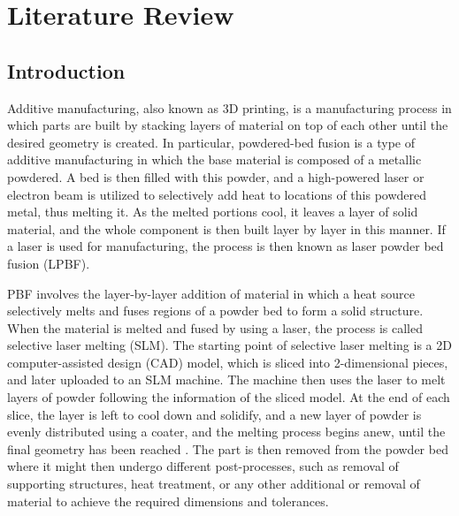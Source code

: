 \documentclass[../main.tex]{subfiles}
\begin{document}
	
\chapter{Literature Review}

\section{Introduction}

Additive manufacturing, also known as 3D printing, is a manufacturing process in which parts are built by stacking layers of material on top of each other until the desired geometry is created. In particular, powdered-bed fusion is a type of additive manufacturing in which the base material is composed of a metallic powdered. A bed is then filled with this powder, and a high-powered laser or electron beam is utilized to selectively add heat to locations of this powdered metal, thus melting it. As the melted portions cool, it leaves a layer of solid material, and the whole component is then built layer by layer in this manner. If a laser is used for manufacturing, the process is then known as laser powder bed fusion (LPBF).

PBF involves the layer-by-layer addition of material in which a heat source selectively melts and fuses regions of a powder bed to form a solid structure. When the material is melted and fused by using a laser, the process is called selective laser melting (SLM). The starting point of selective laser melting is a 2D computer-assisted design (CAD) model, which is sliced into 2-dimensional pieces, and later uploaded to an SLM machine. The machine then uses the laser to melt layers of powder following the information of the sliced model. At the end of each slice, the layer is left to cool down and solidify, and a new layer of powder is evenly distributed using a coater, and the melting process begins anew, until the final geometry has been reached \cite{valinoAdvances3DPrinting2019}. The part is then removed from the powder bed where it might then undergo different post-processes, such as removal of supporting structures, heat treatment, or any other additional or removal of material to achieve the required dimensions and tolerances. 
\end{document}
